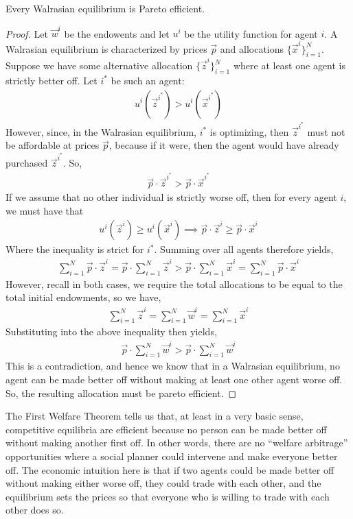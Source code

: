 \begin{theorem*}
    Every Walrasian equilibrium is Pareto efficient. 
\end{theorem*}
\begin{proof}
    Let $\vec{w}^i$ be the endowents and let $u^i$ be the utility function for agent $i$. A Walrasian equilibrium is characterized by prices $\vec{p}$ and allocations $\{\vec{x}^i\}_{i = 1}^N$. Suppose we have some alternative allocation $\{\vec{z}^i\}_{i = 1}^N$ where at least one agent is strictly better off. Let $i^*$ be such an agent: 
    \begin{align*}
        u^i(\vec{z}^{i^*}) > u^i(\vec{x}^{i^*})
    \end{align*}
    However, since, in the Walrasian equilibrium, $i^*$ is optimizing, then $\vec{z}^{i^*}$ must not be affordable at prices $\vec{p}$, because if it were, then the agent would have already purchased $\vec{z}^{i^*}$. So,
    \begin{align*}
        \vec{p} \cdot \vec{z}^{i^*} > \vec{p} \cdot \vec{x}^{i^*}
    \end{align*}
    If we assume that no other individual is strictly worse off, then for every agent $i$, we must have that
    \begin{align*}
        u^i(\vec{z}^i) \geq u^i(\vec{x}^i) \implies \vec{p} \cdot \vec{z}^i \geq \vec{p} \cdot \vec{x}^i
    \end{align*}
    Where the inequality is strict for $i^*$. Summing over all agents therefore yields,
    \begin{align*}
        \sum_{i = 1}^N \vec{p} \cdot \vec{z}^i = \vec{p} \cdot \sum_{i = 1}^N \vec{z}^i > \vec{p} \cdot \sum_{i = 1}^N \vec{x}^i = \sum_{i = 1}^N \vec{p} \cdot \vec{x}^i
    \end{align*}
    However, recall in both cases, we require the total allocations to be equal to the total initial endowments, so we have,
    \begin{align*}
        \sum_{i = 1}^N \vec{z}^i = \sum_{i = 1}^N \vec{w}^i = \sum_{i = 1}^N \vec{x}^i
    \end{align*}
    Substituting into the above inequality then yields,
    \begin{align*}
        \vec{p} \cdot \sum_{i = 1}^N \vec{w}^i > \vec{p} \cdot \sum_{i = 1}^N \vec{w}^i
    \end{align*}
    This is a contradiction, and hence we know that in a Walrasian equilibrium, no agent can be made better off without making at least one other agent worse off. So, the resulting allocation must be pareto efficient. 
\end{proof}

The First Welfare Theorem tells us that, at least in a very basic sense, competitive equilibria are efficient because no person can be made better off without making another first off. In other words, there are no ``welfare arbitrage'' opportunities where a social planner could intervene and make everyone better off. The economic intuition here is that if two agents could be made better off without making either worse off, they could trade with each other, and the equilibrium sets the prices so that everyone who is willing to trade with each other does so. 

